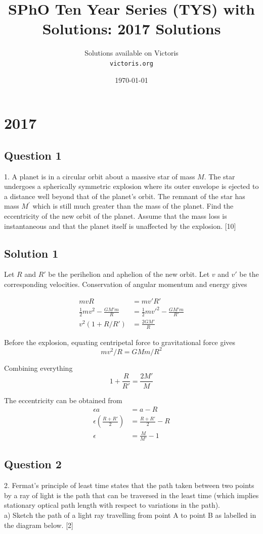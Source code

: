 \documentclass{article}
\title{SPhO Ten Year Series (TYS) with Solutions: 2017 Solutions}
\author{
    Solutions available on Victoris\\
    \texttt{victoris.org}
}
\date{\today}
\begin{document}
\maketitle


\section{2017}
\subsection{Question 1}
1. A planet is in a circular orbit about a massive star of mass $M$. The star undergoes a spherically symmetric explosion where its outer envelope is ejected to a distance well beyond that of the planet's orbit. The remnant of the star has mass $M^{\prime}$ which is still much greater than the mass of the planet. Find the eccentricity of the new orbit of the planet. Assume that the mass loss is instantaneous and that the planet itself is unaffected by the explosion. [10]

\subsection{Solution 1}
Let $R$ and $R'$ be the perihelion and aphelion of the new orbit. Let $v$ and $v'$ be the corresponding velocities. Conservation of angular momentum and energy gives

\begin{align}
    mvR &= mv' R'\\
    \frac{1}{2}mv^2-\frac{GM'm}{R} &= \frac{1}{2}mv'^2-\frac{GM'm}{R'} \\
    v^2(1+R/R') &= \frac{2GM'}{R}
\end{align}

Before the explosion, equating centripetal force to gravitational force gives
\[mv^2/R=GMm/R^2\]

Combining everything
\[1+\frac{R}{R'} = \frac{2M'}{M}\]

The eccentricity can be obtained from
\begin{align}
    \epsilon a &= a-R \\
    \epsilon \left(\frac{R+R'}{2} \right) &= \frac{R+R'}{2} - R\\
    \epsilon &= \frac{M}{M'} - 1
\end{align}

\pagebreak

\subsection{Question 2}
2. Fermat's principle of least time states that the path taken between two points by a ray of light is the path that can be traversed in the least time (which implies stationary optical path length with respect to variations in the path). \\
a) Sketch the path of a light ray travelling from point A to point B as labelled in the diagram below. [2] \\
\end{document}
